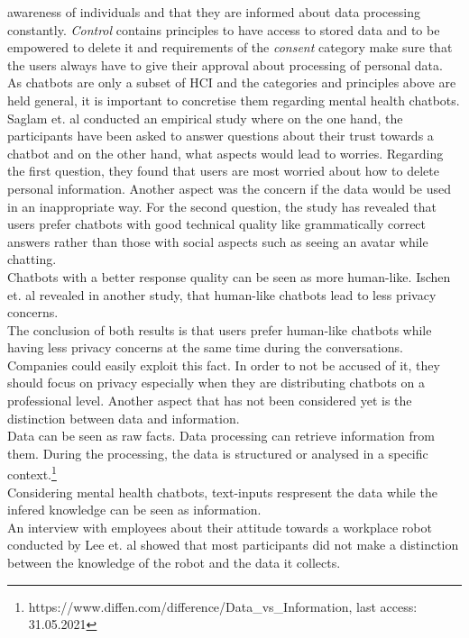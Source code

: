 \documentclass[sigconf, nonacm]{acmart}
\begin{document}
awareness of individuals and that they are informed about data processing constantly. \emph{Control} contains principles to have access to stored data and to be empowered to delete it and requirements of the \emph{consent} category make sure that the users always have to give their approval about processing of personal data.
\\
As chatbots are only a subset of HCI and the categories and principles above are held general, it is important to concretise them regarding mental health chatbots.
\\
Saglam et. al \cite{Saglam2021} conducted an empirical study where on the one hand, the participants have been asked to answer questions about their trust towards a chatbot and 
on the other hand, what aspects would lead to worries. Regarding the first question, they found that users are most worried about how to delete personal information. Another aspect was the concern if the data would be used in an inappropriate way. 
For the second question, the study has revealed that users prefer chatbots with good technical quality like grammatically correct answers rather than those with social aspects such as seeing an avatar while chatting.
\\
Chatbots with a better response quality can be seen as more human-like. Ischen et. al \cite{Ischen} revealed in another study, that human-like chatbots lead to less privacy concerns.
\\
The conclusion of both results is that users prefer human-like chatbots while having less privacy concerns at the same time during the conversations. Companies could easily exploit this fact. In order to not be accused of it, they should focus on privacy especially when they are distributing chatbots on a professional level.  
Another aspect that has not been considered yet is the distinction between data and information.
\\
Data can be seen as raw facts. Data processing can retrieve information from them. During the processing, the data is structured or analysed in a specific context.\footnote{https://www.diffen.com/difference/Data\_vs\_Information, last access: 31.05.2021}
\\ 
Considering mental health chatbots, text-inputs respresent the data while
the infered knowledge can be seen as information.
\\
An interview with employees about their attitude towards a workplace robot conducted by Lee et. al \cite{Lee2011} showed that most participants did not make a distinction between the knowledge of the robot and the data it collects.
\end{document}
